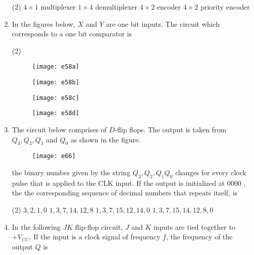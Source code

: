 \begin{enumerate}
	\begin{tasks}(2)
		\task[\textbf{A.}] $4 \times 1$ multiplexer
		\task[\textbf{B.}] $1 \times 4$ demultiplexer
		\task[\textbf{C.}] $4 \times 2$ encoder
		\task[\textbf{D.}] $4 \times 2$ priority encoder
	\end{tasks}
	\item In the figures below, $X$ and $Y$ are one bit inputs. The circuit which corresponds to a one bit comparator is
	{	}
	\begin{tasks}(2)
		\task[\textbf{A.}] \begin{figure}[H]
			\centering
			\texttt{[image: e58a]}
		\end{figure}
		\task[\textbf{B.}] \begin{figure}[H]
			\centering
			\texttt{[image: e58b]}
		\end{figure}
		\task[\textbf{C.}] \begin{figure}[H]
			\centering
			\texttt{[image: e58c]}
		\end{figure}
		\task[\textbf{D.}] \begin{figure}[H]
			\centering
			\texttt{[image: e58d]}
		\end{figure}
	\end{tasks}
	\item The circuit below comprises of $D$-flip flops. The output is taken from $Q_{3}, Q_{2}, Q_{1}$ and $Q_{0}$ as shown in the figure.\\
	\begin{figure}[H]
		\centering
		\texttt{[image: e66]}
	\end{figure}
	the binary number given by the string $Q_{3}, Q_{2}, Q_{1} Q_{0}$ changes for every clock pulse that is applied to the CLK input. If the output is initialized at 0000 , the the corresponding sequence of decimal numbers that repeats itself, is
	{	}
	\begin{tasks}(2)
		\task[\textbf{A.}] $3,2,1,0$
		\task[\textbf{B.}] $1,3,7,14,12,8$
		\task[\textbf{C.}] $1,3,7,15,12,14,0$
		\task[\textbf{D.}] $1,3,7,15,14,12,8,0$
	\end{tasks}
	\item In the following $J K$ flip-flop circuit, $J$ and $K$ inputs are tied together to $+V_{C C} .$ If the input is a clock signal of frequency $f$, the frequency of the output $Q$ is
	{	}
	\begin{figure}[H]

\end{figure}
\end{enumerate}
